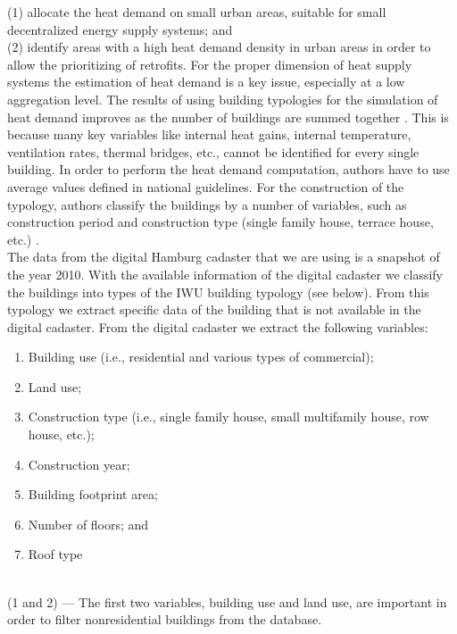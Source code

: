 \documentclass[11pt]{IJM-article}
\begin{document}
(1) allocate the heat demand on small urban areas, suitable for small
decentralized energy supply systems; and\\

(2) identify areas with a high heat demand density in urban areas in order to
allow the prioritizing of retrofits. For the proper dimension of heat supply
systems the estimation of heat demand is a key issue, especially at a low
aggregation level. The results of using building typologies for the simulation
of heat demand improves as the number of buildings are summed together
.  This is because many key variables like internal heat
gains, internal temperature, ventilation rates, thermal bridges, etc., cannot
be identified for every single building.  In order to perform the heat demand
computation, authors have to use average values defined in national guidelines.
For the construction of the typology, authors classify the buildings by a
number of variables, such as construction period and construction type (single
family house, terrace house, etc.) .\\

The data from the digital Hamburg cadaster that we are using is a snapshot of
the year 2010.  With the available information of the digital cadaster we
classify the buildings into types of the IWU building typology (see below).
From this typology we extract specific data of the building that is not
available in the digital cadaster. From the digital cadaster we extract the
following variables:\\

\begin{enumerate}
    \item Building use (i.e., residential and various types of commercial);
    \item Land use;
    \item Construction type (i.e., single family house, small multifamily
        house, row house, etc.);
    \item Construction year;
    \item Building footprint area;
    \item Number of floors; and
    \item Roof type
\end{enumerate}\\

(1 and 2) --- The first two variables, building use and land use, are important
in order to filter nonresidential buildings from the database.\\
\end{document}
